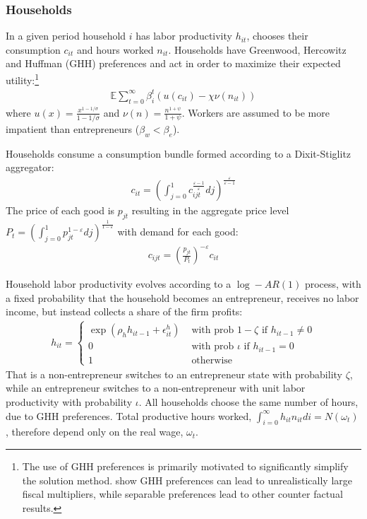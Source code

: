 \documentclass[12pt,a4paper]{article}
\begin{document}
\subsubsection{Households}
In a given period household $i$ has labor productivity $h_{it}$, chooses their consumption $c_{it}$ and hours worked $n_{it}$. Households have Greenwood, Hercowitz and Huffman (GHH) preferences and act in order to maximize their expected utility:\footnote{The use of GHH preferences is primarily motivated to significantly simplify the solution method. \cite{arGHH} show GHH preferences can lead to unrealistically large fiscal multipliers, while separable preferences lead to other counter factual results.}
\begin{align*}
\mathbb{E} \sum_{t=0}^{\infty}\beta_i^t ( u(c_{it}) -  \chi \nu(n_{it}) ) 
\end{align*}
where $u(x) = \frac{x^{1-1/\sigma}}{1-1/\sigma}$ and $\nu(n) = \frac{n^{1+\psi}}{1+\psi}$. Workers are assumed to be more impatient than entrepreneurs \small{($\beta_w < \beta_e$)}.
\normalsize \par
Households consume a consumption bundle formed according to a Dixit-Stiglitz aggregator:
\begin{align*}
c_{it} = \left(\int_{j=0}^{1} c_{ijt}^{\frac{\varepsilon-1}{\varepsilon}} dj \right)^{\frac{\varepsilon}{\varepsilon-1}}
\end{align*}
The price of each good is $p_{jt}$ resulting in the aggregate price level $P_t = \left(\int_{j=0}^{1} p_{jt}^{1-\varepsilon} dj \right)^{\frac{1}{1-\varepsilon}}$ with demand for each good:
\begin{align*}
c_{ijt} = \left(\frac{p_{jt}}{P_t} \right)^{-\varepsilon} c_{it}
\end{align*}

Household labor productivity evolves according to a $\log-AR(1)$ process, with a fixed probability that the household becomes an entrepreneur, receives no labor income, but instead collects a share of the firm profits:
\begin{align*}
h_{it} = \begin{cases}
				\exp(\rho_h h_{it-1} + \epsilon^h_{it}) &\text{ with prob } 1-\zeta \text{ if } h_{it-1} \ne 0\\
				0 &\text{  with prob } \iota \text{ if } h_{it-1} = 0 \\
				1	&\text{ otherwise}
\end{cases}
\end{align*}
That is a non-entrepreneur switches to an entrepreneur state with probability $\zeta$, while an entrepreneur switches to a non-entrepreneur with unit labor productivity with probability $\iota$. All households choose the same number of hours, due to GHH preferences. Total productive hours worked, $\int_{i=0}^{\infty} h_{it}n_{it}di = N(\omega_t)$, therefore depend only on the real wage, $\omega_t$.
\end{document}
